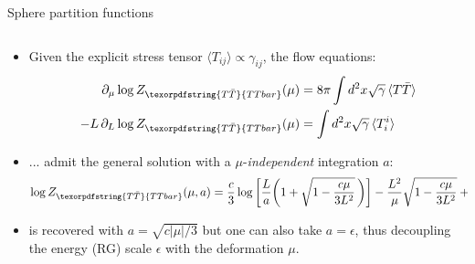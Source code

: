 \documentclass[
	10pt
	,noamsthm
]{beamer}
\newcommand{\TTbar}{\texorpdfstring{\ensuremath{T\bar{T}}}{TTbar}\xspace}
\begin{document}
\begin{frame}{Sphere partition functions}{%
	\textcite{Donnelly:2018bef,Li:2020zjb}
}
\begin{columns}
\begin{column}{\textwidth}
\vspace{-.3\baselineskip}
\begin{itemize}

\item Given the explicit stress tensor $\langle T_{ij}\rangle \propto \gamma_{ij}$, the flow equations:
	\begin{align*}
\partial_\mu \log Z_{\TTbar}(\mu)&=8\pi \int d^2x\sqrt{\gamma}\, \langle T\bar{T} \rangle \\
-L\,\partial_L \log Z_{\TTbar}(\mu)&=\int d^2x\sqrt{\gamma}\,\langle T^i_i \rangle
	\end{align*}

	\item ... admit the general solution with a $\mu$-\textit{independent} integration $a$:
	\begin{equation*}
		\log Z_{\TTbar}(\mu, a) = \frac{c}{3} \log \bigg[\frac{L}{a}   \bigg(1+\sqrt{1-\frac{c \mu }{3  L^2}}\, \bigg) \bigg] - \frac{L^2}{\mu}  \sqrt{1-\frac{c \mu }{3 L^2}} + \frac{L^2}{\mu} %
	\end{equation*}

	\item \textcite{Donnelly:2018bef} is recovered with $a = \sqrt{c|\mu|/3}$ but one can also take $a = \epsilon$, thus decoupling the energy (RG) scale $\epsilon$ with the deformation $\mu$. 
\end{itemize}
\end{column}
\end{columns}
\end{frame}
\end{document}
